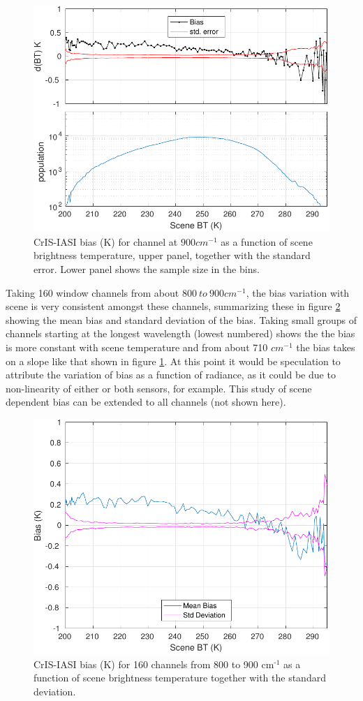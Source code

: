 \documentclass[11pt]{article}
\begin{document}
\begin{figure}[htb]
\centering
\includegraphics[width=.6\linewidth]{./figs/IC_jplSNO_Bias_stdErr_900wn_vsScene_quantile.pdf}
\caption{\label{fig:orgparagraph8}
  CrIS-IASI bias (K) for channel at $900 cm^{-1}$ as a function of scene brightness temperature, upper panel, together with the standard error. Lower panel shows the sample size in the bins.}
\label{fig:X7}
\end{figure}

Taking 160 window channels from about $800\ to\ 900 cm^{-1}$, the bias variation with scene
is very consistent amongst these channels, summarizing these in figure \ref{fig:X8} showing the mean bias and standard deviation of the bias. Taking small groups of channels starting at the longest wavelength (lowest numbered) shows the the bias is more constant with scene temperature and from about 710 \(cm^{-1}\) the bias takes on a slope like that shown in figure \ref{fig:X7}. At this point it would be speculation to attribute the variation of bias as a function of radiance, as it could be due to non-linearity of either or both sensors, for example. This study of scene dependent bias can be extended to all channels (not shown here).

\begin{figure}[htb]
\centering
\includegraphics[width=.6\linewidth]{./figs/IC_jplSNO_Bias_std_160LWchns_vsScene.pdf}
\caption{\label{fig:orgparagraph9}
  CrIS-IASI bias (K) for 160 channels from 800 to 900 cm\(^{\text{-1}}\) as a function of scene brightness temperature together with the standard deviation.}
\label{fig:X8}
\end{figure}
\end{document}
